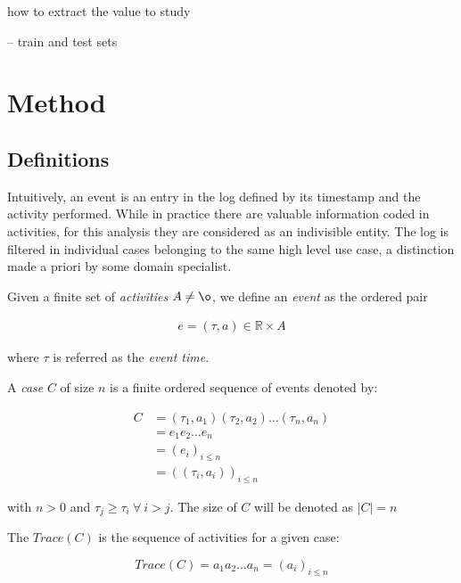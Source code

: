 \documentclass{article}
\begin{document}
how to extract the value to study

-- train and test sets



\section{Method}

\subsection{Definitions}

Intuitively, an event is an entry in the log defined by its timestamp and the activity performed. While in practice there are valuable information coded in activities, for this analysis they are considered as an indivisible entity. The log is filtered in individual cases belonging to the same high level use case, a distinction made a priori by some domain specialist.

Given a finite set of \emph{activities} $A \neq \o$, we define an \emph{event} as the ordered pair 

\begin{equation}
\begin{split}
    e = (\tau, a) \in \mathbb{R} \times A
\end{split}
\end{equation}

where $\tau$ is referred as the \emph{event time}. 

A \emph{case} $C$ of size $n$ is a finite ordered sequence of events denoted by:

\begin{equation}
\begin{split}
    C & = (\tau_1,a_1)(\tau_2,a_2)  \dots (\tau_n,a_n) \\ 
      & = e_1 e_2 \dots e_n \\
      & = (e_i)_{i \leq n} \\
      & = ( (\tau_i, a_i) )_{i \leq n}
\end{split}
\end{equation}

with $n > 0$ and $\tau_j \geq \tau_i\ \forall\ i > j$. The size of $C$ will be denoted as $|C| = n$

The $Trace(C)$ is the sequence of activities for a given case: 

\begin{equation}
    Trace(C) = a_1 a_2 \dots a_n = (a_i)_{i \leq n}
\end{equation}
\end{document}
